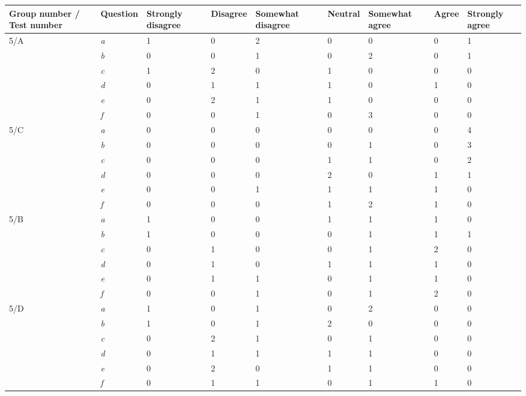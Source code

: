 \begin{center}\small \label{Test5}
	\begin{tabular}{ p{1.4cm} | p{1.4cm} | p{1.3cm} | p{1.4cm} | p{1.7cm} | p{1.2cm} | p{1.7cm} | p{0.9cm}| p{1.3cm} |}
\hline
\textbf{Group number / Test 	number} &\textbf{Question}	&	\textbf{Strongly disagree}	&	\textbf{Disagree}	&	\textbf{Somewhat disagree}	&	\textbf{Neutral}	&	\textbf{Somewhat agree}	&	\textbf{Agree}	&	\textbf{Strongly agree} \\ \hline		
5/A		&	\textit{a}	&	1	&	0	&	2	&	0	&	0	&	0	&	1	\\ \hline
		&	\textit{b}	&	0	&	0	&	1	&	0	&	2	&	0	&	1	\\ \hline
		&	\textit{c}	&	1	&	2	&	0	&	1	&	0	&	0	&	0	\\ \hline
		&	\textit{d}	&	0	&	1	&	1	&	1	&	0	&	1	&	0	\\ \hline
		&	\textit{e}	&	0	&	2	&	1	&	1	&	0	&	0	&	0	\\ \hline
		&	\textit{f}	&	0	&	0	&	1	&	0	&	3	&	0	&	0	\\ \hline
5/C		&	\textit{a}	&	0	&	0	&	0	&	0	&	0	&	0	&	4	\\ \hline
		&	\textit{b}	&	0	&	0	&	0	&	0	&	1	&	0	&	3	\\ \hline
		&	\textit{c}	&	0	&	0	&	0	&	1	&	1	&	0	&	2	\\ \hline
		&	\textit{d}	&	0	&	0	&	0	&	2	&	0	&	1	&	1	\\ \hline
		&	\textit{e}	&	0	&	0	&	1	&	1	&	1	&	1	&	0	\\ \hline
		&	\textit{f}	&	0	&	0	&	0	&	1	&	2	&	1	&	0	\\ \hline
5/B		&	\textit{a}	&	1	&	0	&	0	&	1	&	1	&	1	&	0	\\ \hline
		&	\textit{b}	&	1	&	0	&	0	&	0	&	1	&	1	&	1	\\ \hline
		&	\textit{c}	&	0	&	1	&	0	&	0	&	1	&	2	&	0	\\ \hline
		&	\textit{d}	&	0	&	1	&	0	&	1	&	1	&	1	&	0	\\ \hline
		&	\textit{e}	&	0	&	1	&	1	&	0	&	1	&	1	&	0	\\ \hline
		&	\textit{f}	&	0	&	0	&	1	&	0	&	1	&	2	&	0	\\ \hline
5/D		&	\textit{a}	&	1	&	0	&	1	&	0	&	2	&	0	&	0	\\ \hline
		&	\textit{b}	&	1	&	0	&	1	&	2	&	0	&	0	&	0	\\ \hline
		&	\textit{c}	&	0	&	2	&	1	&	0	&	1	&	0	&	0	\\ \hline
		&	\textit{d}	&	0	&	1	&	1	&	1	&	1	&	0	&	0	\\ \hline
		&	\textit{e}	&	0	&	2	&	0	&	1	&	1	&	0	&	0	\\ \hline
		&	\textit{f}	&	0	&	1	&	1	&	0	&	1	&	1	&	0	\\ \hline
	\end{tabular}
\end{center}		

